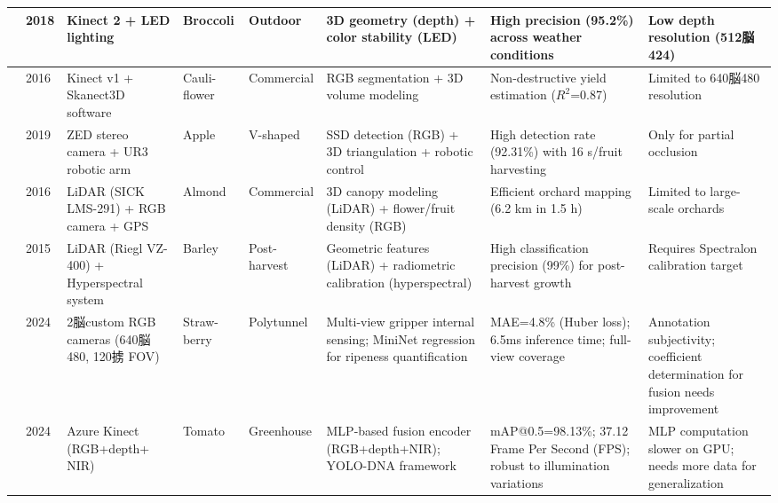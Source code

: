 \documentclass[a4paper,fleqn]{cas-dc}
\begin{document}
\begin{table}[ht]
\begin{tabular}{p{}p{}p{}p{}p{}p{}p{}p{}}
\hline
\cite{kusumam20173d} & 2018 & Kinect 2 + LED lighting & Broccoli & Outdoor & 3D geometry (depth) + color stability (LED) & High precision (95.2\%) across weather conditions & Low depth resolution (512脳424)  \\ 
\hline
\cite{andujar2016using} & 2016 & Kinect v1 + Skanect3D software & Cauli- flower & Commercial & RGB segmentation + 3D volume modeling & Non-destructive yield estimation ($R^2$=0.87) & Limited to 640脳480 resolution \\ 
\hline
\cite{onishi2019automated} & 2019 & ZED stereo camera + UR3 robotic arm & Apple & V-shaped & SSD detection (RGB) + 3D triangulation + robotic control & High detection rate (92.31\%) with 16 s/fruit harvesting & Only for partial occlusion \\ 
\hline
\cite{underwood2016mapping} & 2016 & LiDAR (SICK LMS-291) + RGB camera + GPS & Almond & Commercial & 3D canopy modeling (LiDAR) + flower/fruit density (RGB) & Efficient orchard mapping (6.2 km in 1.5 h) & Limited to large-scale orchards  \\ 
\hline
\cite{koenig2015comparative} & 2015 & LiDAR (Riegl VZ-400) + Hyperspectral system & Barley & Post-harvest & Geometric features (LiDAR) + radiometric calibration (hyperspectral) & High classification precision (99\%) for post-harvest growth & Requires Spectralon calibration target  \\ 
\hline
\cite{ge2024multi} & 2024 & 2脳custom RGB cameras (640脳480, 120掳 FOV) & Straw- berry & Polytunnel & Multi-view gripper internal sensing; MiniNet regression for ripeness quantification & MAE=4.8\% (Huber loss); 6.5ms inference time; full-view coverage & Annotation subjectivity; coefficient determination for fusion needs improvement \\
\hline
\cite{chen2024mlp} & 2024 & Azure Kinect (RGB+depth+ NIR) & Tomato & Greenhouse & MLP-based fusion encoder (RGB+depth+NIR); YOLO-DNA framework & mAP@0.5=98.13\%; 37.12 Frame Per Second (FPS); robust to illumination variations & MLP computation slower on GPU; needs more data for generalization  \\
\hline
\end{tabular}
\end{table}
\end{document}

